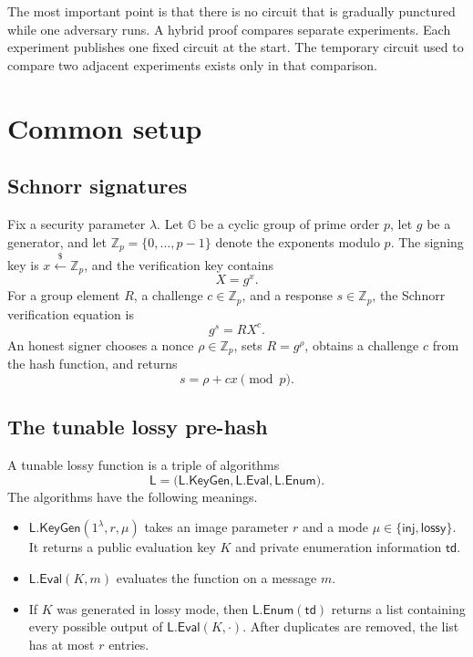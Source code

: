 \documentclass[11pt]{article}
\newcommand{\Zp}{\mathbb{Z}_p}
\newcommand{\getsr}{\mathrel{\mathop{\leftarrow}\limits^{\$}}}
\newcommand{\inj}{\mathsf{inj}}
\newcommand{\lossy}{\mathsf{lossy}}
\begin{document}
The most important point is that there is no circuit that is gradually
punctured while one adversary runs.  A hybrid proof compares separate
experiments.  Each experiment publishes one fixed circuit at the start.  The
temporary circuit used to compare two adjacent experiments exists only in
that comparison.

\section{Common setup}

\subsection{Schnorr signatures}

Fix a security parameter \(\lambda\).  Let \(\mathbb{G}\) be a cyclic group
of prime order \(p\), let \(g\) be a generator, and let
\(\Zp=\{0,\ldots,p-1\}\) denote the exponents modulo \(p\).  The signing key is
\(x\getsr\Zp\), and the verification key contains
\[
  X=g^x.
\]
For a group element \(R\), a challenge \(c\in\Zp\), and a response
\(s\in\Zp\), the Schnorr verification equation is
\[
  g^s=R X^c.
\]
An honest signer chooses a nonce \(\rho\in\Zp\), sets \(R=g^\rho\), obtains a
challenge \(c\) from the hash function, and returns
\[
  s=\rho+cx \pmod p.
\]

\subsection{The tunable lossy pre-hash}

A tunable lossy function is a triple of algorithms
\[
  \mathsf{L}
  =
  \bigl(\mathsf{L.KeyGen},\mathsf{L.Eval},\mathsf{L.Enum}\bigr).
\]
The algorithms have the following meanings.

\begin{itemize}[leftmargin=2em]
\item
  \(\mathsf{L.KeyGen}(1^\lambda,r,\mu)\) takes an image parameter \(r\) and a
  mode \(\mu\in\{\inj,\lossy\}\).  It returns a public evaluation key \(K\)
  and private enumeration information \(\mathsf{td}\).
\item
  \(\mathsf{L.Eval}(K,m)\) evaluates the function on a message \(m\).
\item
  If \(K\) was generated in lossy mode, then
  \(\mathsf{L.Enum}(\mathsf{td})\) returns a list containing every possible
  output of \(\mathsf{L.Eval}(K,\cdot)\).  After duplicates are removed, the
  list has at most \(r\) entries.
\end{itemize}
\end{document}
